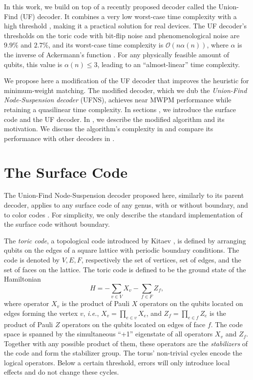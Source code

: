 In this work, we build on top of a recently proposed decoder called the Union-Find (UF) decoder. It combines a very low worst-case time complexity with a high threshold \cites{delfosse2017almost}, making it a practical solution for real devices. The UF decoder's thresholds on the toric code with bit-flip noise and phenomenological noise are $9.9\%$ and $2.7\%$, and its worst-case time complexity is $\mathcal{O}(n\alpha(n))$, where $\alpha$ is the inverse of Ackermann's function \cite{tarjan1975efficiency}. For any physically feasible amount of qubits, this value is $\alpha(n) \leq 3$, leading to an ``almost-linear'' time complexity.

We propose here a modification of the UF decoder that improves the heuristic for minimum-weight matching. The modified decoder, which we dub the \emph{Union-Find Node-Suspension decoder} (UFNS), achieves near MWPM performance while retaining a quasilinear time complexity. In sections , we introduce the surface code and the UF decoder. In , we describe the modified algorithm and its motivation. We discuss the algorithm's complexity in  and compare its performance with other decoders in .  

\section{The Surface Code}\label{sec:surfacecode}

The Union-Find Node-Suspension decoder proposed here, similarly to its parent decoder, applies to any surface code of any genus, with or without boundary, and to color codes \cite{delfosse2017almost}. For simplicity, we only describe the standard implementation of the surface code without boundary.

The \emph{toric code}, a topological code introduced by Kitaev \cite{kitaev2003fault}, is defined by arranging qubits on the edges of a square lattice with periodic boundary conditions. The code is denoted by $V,E,F$, respectively the set of vertices, set of edges, and the set of faces on the lattice. The toric code is defined to be the ground state of the Hamiltonian 
\begin{equation}
    H = -\sum_{v \in V} X_v -\sum_{f \in F} Z_f, 
\end{equation}
where operator $X_v$ is the product of Pauli $X$ operators on the qubits located on edges forming the vertex $v$, \emph{i.e.}, $X_v = \prod_{e \in v} X_e$, and $Z_f = \prod_{e \in f} Z_e$ is the product of Pauli $Z$ operators on the qubits located on edges of face $f$. The code space is spanned by the simultaneous ``+1'' eigenstate of all operators $X_v$ and $Z_f$. Together with any possible product of them, these operators are the \emph{stabilizers} of the code and form the stabilizer group. The torus' non-trivial cycles encode the logical operators. Below a certain threshold, errors will only introduce local effects and do not change these cycles.

